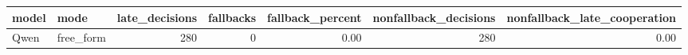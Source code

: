 \begin{tabular}{llrrrrr}
\toprule
model & mode & late\_decisions & fallbacks & fallback\_percent & nonfallback\_decisions & nonfallback\_late\_cooperation \\
\midrule
Qwen & free\_form & 280 & 0 & 0.00 & 280 & 0.00 \\
\bottomrule
\end{tabular}
